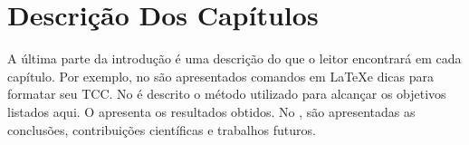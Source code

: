 \section{Descrição Dos Capítulos}

A última parte da introdução é uma descrição do que o leitor encontrará em cada capítulo.
Por exemplo, no  são apresentados comandos em \LaTeX e dicas para formatar seu TCC.
No  é descrito o método utilizado para alcançar os objetivos listados aqui.
O  apresenta os resultados obtidos.
No , são apresentadas as conclusões, contribuições científicas e trabalhos futuros.


